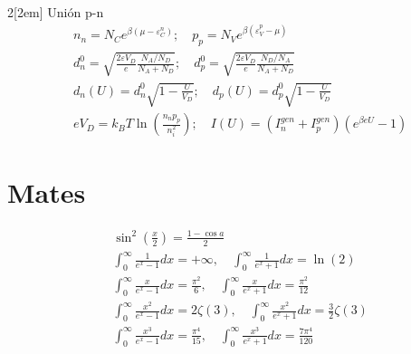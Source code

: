 \documentclass[leqno]{article}
\begin{document}
\begin{multicols}{2}[\columnsep2em]
Unión p-n
\begin{align*}
  &n_n = N_C e ^{\beta (\mu -\varepsilon _C^n)}; \quad p_p = N_V e ^{\beta (\varepsilon _V^p-\mu )}\\
  &d^0_n = \sqrt{ \frac{2\varepsilon V_D}{e} \frac{N_A / N_D}{N_A+N_D}}; \quad d_p^0 = \sqrt{\frac{2\varepsilon V_D}{e}\frac{N_D / N_A}{N_A+N_D}} \\
  & d_n(U) = d_n^0 \sqrt{1- \frac{U}{V_D}}; \quad d_p(U) = d_p^0 \sqrt{1- \frac{U}{V_D}}\\
  &eV_D=k_BT\ln\left( \frac{n_np_p}{n^2_i}\right); \quad I(U) = (I_n ^{gen} +I_p ^{gen})(e ^{\beta eU}-1)
\end{align*}




\section{Mates}
\begin{align*}
&\sin^2 \left(\frac{x}{2}\right) = \frac{1-\cos a}{2}\\
&\int_0^\infty \frac{1}{e^x-1}dx = +\infty, \quad \int_0^\infty \frac{1}{e^x+1}dx = \ln(2)\\
&\int_0^\infty \frac{x}{e^x-1}dx = \frac{\pi^2}{6}, \quad \int_0^\infty \frac{x}{e^x+1}dx = \frac{\pi^2}{12} \\
&\int_0^\infty \frac{x^2}{e^x-1}dx = 2\zeta(3), \quad \int_0^\infty \frac{x^2}{e^x+1}dx = \frac{3}{2}\zeta(3)\\
&\int_0^\infty \frac{x^3}{e^x-1}dx = \frac{\pi^4}{15}, \quad \int_0^\infty \frac{x^3}{e^x+1}dx = \frac{7\pi^4}{120} 
\end{align*}

\end{multicols}
\end{document}
